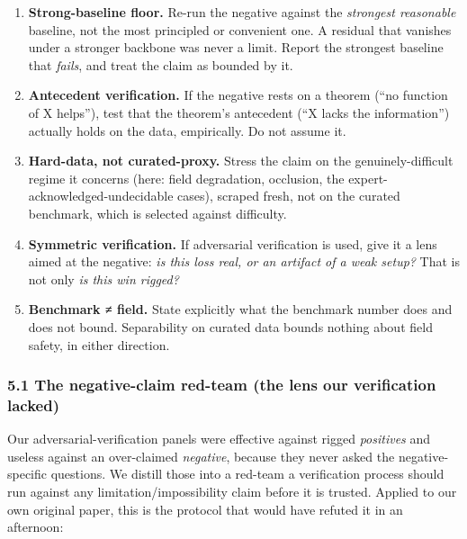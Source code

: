 \begin{enumerate}
\def\labelenumi{\arabic{enumi}.}
\tightlist
\item
  \textbf{Strong-baseline floor.} Re-run the negative against the
  \emph{strongest reasonable} baseline, not the most principled or
  convenient one. A residual that vanishes under a stronger backbone was
  never a limit. Report the strongest baseline that \emph{fails}, and
  treat the claim as bounded by it.
\item
  \textbf{Antecedent verification.} If the negative rests on a theorem
  (``no function of X helps''), test that the theorem's antecedent (``X
  lacks the information'') actually holds on the data, empirically. Do
  not assume it.
\item
  \textbf{Hard-data, not curated-proxy.} Stress the claim on the
  genuinely-difficult regime it concerns (here: field degradation,
  occlusion, the expert-acknowledged-undecidable cases), scraped fresh,
  not on the curated benchmark, which is selected against difficulty.
\item
  \textbf{Symmetric verification.} If adversarial verification is used,
  give it a lens aimed at the negative: \emph{is this loss real, or an
  artifact of a weak setup?} That is not only \emph{is this win rigged?}
\item
  \textbf{Benchmark ≠ field.} State explicitly what the benchmark number
  does and does not bound. Separability on curated data bounds nothing
  about field safety, in either direction.
\end{enumerate}

\subsubsection{5.1 The negative-claim red-team (the lens our
verification
lacked)}\label{the-negative-claim-red-team-the-lens-our-verification-lacked}

Our adversarial-verification panels were effective against rigged
\emph{positives} and useless against an over-claimed \emph{negative},
because they never asked the negative-specific questions. We distill
those into a red-team a verification process should run against any
limitation/impossibility claim before it is trusted. Applied to our own
original paper, this is the protocol that would have refuted it in an
afternoon:

